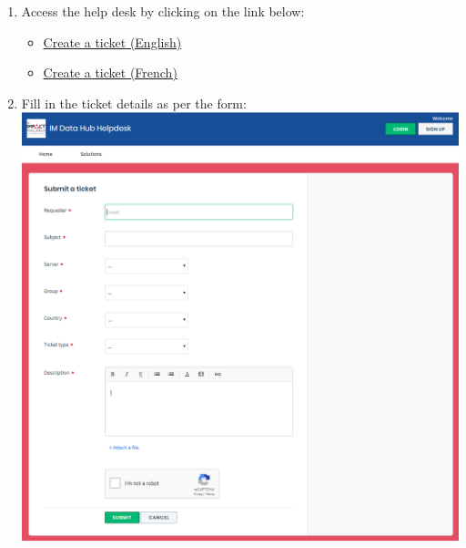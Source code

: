 \documentclass[]{book}
\providecommand{\tightlist}{%
  \setlength{\itemsep}{0pt}\setlength{\parskip}{0pt}}
\begin{document}
\begin{enumerate}
\def\labelenumi{\arabic{enumi}.}
\tightlist
\item
  Access the help desk by clicking on the link below:

  \begin{itemize}
  \tightlist
  \item
    \href{https://imdatahub.freshdesk.com/en/support/tickets/new}{Create a ticket (English)}
  \item
    \href{https://imdatahub.freshdesk.com/fr/support/tickets/new}{Create a ticket (French)}
  \end{itemize}
\item
  Fill in the ticket details as per the form:
  \includegraphics{images/ticket.png}
\end{enumerate}
\end{document}
